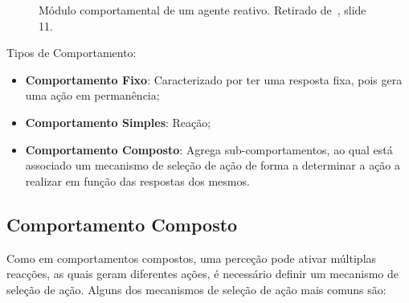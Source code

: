 \begin{figure}[H]
    \begin{center}
    \end{center}
    \caption{Módulo comportamental de um agente reativo.
    Retirado de~\cite{isel:iasa:slides:arq-agentes-reativos-parte-1}, slide 11.}\label{fig:agente-reativo-comportamento}
\end{figure}

Tipos de Comportamento:

\begin{itemize}
    \item \textbf{Comportamento Fixo}: Caracterizado por ter uma resposta fixa, pois gera uma ação em permanência;
    \item \textbf{Comportamento Simples}: Reação;
    \item \textbf{Comportamento Composto}: Agrega sub-comportamentos, ao qual está associado um mecanismo de seleção de ação de forma a determinar a ação a realizar em função das respostas dos mesmos.
\end{itemize}

\subsection{Comportamento Composto}\label{subsec:comportamento-composto}

Como em comportamentos compostos, uma perceção pode ativar múltiplas reacções, as quais geram diferentes ações, é necessário definir um mecanismo de seleção de ação.
Alguns dos mecanismos de seleção de ação mais comuns são:

